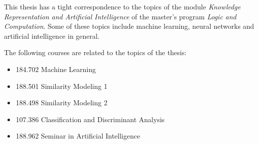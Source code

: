 This thesis has a tight correspondence to the topics of the module \textit{Knowledge Representation and Artificial Intelligence} of the master's program \textit{Logic and Computation}. Some of these topics include machine learning, neural networks and artificial intelligence in general.

The following courses are related to the topics of the thesis:
\begin{itemize}
    \item 184.702 Machine Learning
    \item 188.501 Similarity Modeling 1
    \item 188.498 Similarity Modeling 2
    \item 107.386 Classification and Discriminant Analysis
    \item 188.962 Seminar in Artificial Intelligence
\end{itemize}
